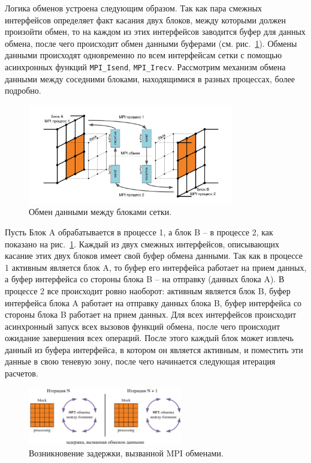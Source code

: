 Логика обменов устроена следующим образом.
Так как пара смежных интерфейсов определяет факт касания двух блоков, между которыми должен произойти обмен, то на каждом из этих интерфейсов заводится буфер для данных обмена, после чего происходит обмен данными буферами (см. рис.~\ref{fig:text_2_block_data_exchange}).
Обмены данными происходят одновременно по всем интерфейсам сетки с помощью асинхронных функций
\texttt{MPI\_Isend}, \texttt{MPI\_Irecv}.
Рассмотрим механизм обмена данными между соседними блоками, находящимися в разных процессах, более подробно.

\begin{figure}[ht]
	\centering
	\includegraphics[width=0.8\textwidth]{./pics/text_2_block/10-data-exchange.pdf}
	\caption{Обмен данными между блоками сетки.}
	\label{fig:text_2_block_data_exchange}
\end{figure}

Пусть Блок A обрабатывается в процессе 1, а блок B -- в процессе 2, как показано на рис.~\ref{fig:text_2_block_data_exchange}.
Каждый из двух смежных интерфейсов, описывающих касание этих двух блоков имеет свой буфер обмена данными.
Так как в процессе 1 активным является блок A, то буфер его интерфейса работает на прием данных, а буфер интерфейса со стороны блока B -- на отправку (данных блока A).
В процессе 2 все происходит ровно наоборот: активным является блок B, буфер интерфейса блока A работает на отправку данных блока B, буфер интерфейса со стороны блока B работает на прием данных.
Для всех интерфейсов происходит асинхронный запуск всех вызовов функций обмена, после чего происходит ожидание завершения всех операций.
После этого каждый блок может извлечь данный из буфера интерфейса, в котором он является активным, и поместить эти данные в свою теневую зону, после чего начинается следующая итерация расчетов.

\begin{figure}[ht]
	\centering
	\includegraphics[width=0.6\textwidth]{./pics/text_2_block/11-mpi1.png}
	\caption{Возникновение задержки, вызванной MPI обменами.}
	\label{fig:text_2_block_mpi1}
\end{figure}

